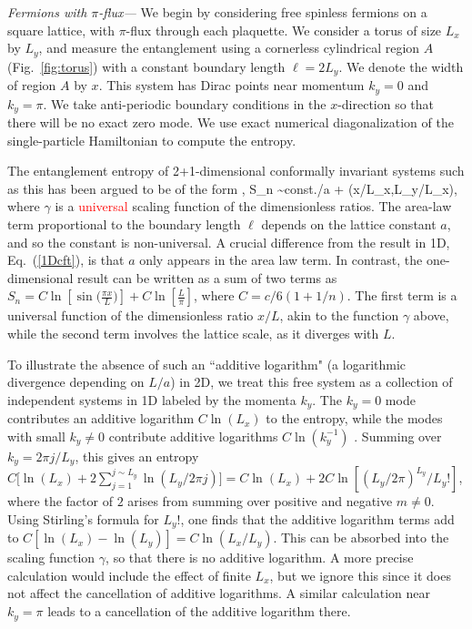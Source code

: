 \documentclass[prb,aps,twocolumn,floatfix,amsmath,amssymb,superscriptaddress,tightenlines]{revtex4}
\begin{document}
{\it Fermions with $\pi$-flux---}
We begin by considering
free spinless fermions on a square lattice, with $\pi$-flux through each plaquette.  We consider a torus of size $L_x$ by $L_y$, and
measure the entanglement  
using a cornerless cylindrical region $A$ (Fig.~\ref{fig:torus}) with a constant boundary length $\ell = 2L_y$.
We denote the width of region $A$ by $x$.
This system has Dirac points near momentum $k_y=0$ and $k_y=\pi$.  We take anti-periodic boundary conditions in the $x$-direction so that there will be no exact zero mode.  We use exact numerical diagonalization of the single-particle Hamiltonian to compute the entropy.

The entanglement entropy of 2+1-dimensional conformally invariant systems such as this has been argued to be of the form \cite{ryu,ZGV},
\be
S_n \sim {\rm const.}\times \ell /a + \gamma(x/L_x,L_y/L_x),
\ee
where $\gamma$ is a \textcolor{red}{universal} scaling function of the dimensionless ratios.
The area-law term proportional to the boundary length $\ell$ depends on the lattice constant $a$, and so the constant is non-universal. A crucial difference
from the result in 1D, Eq.~(\ref{1Dcft}), is that $a$ only appears in the area law term.  In contrast, the one-dimensional result can be written as a sum of two terms as
$S_n =C \ln[\sin\big( \frac{\pi x}{L} \big)]+ C\ln[\frac{L}{\pi}] $, where $C=c/6(1+1/n)$.
The first term is a universal function of the dimensionless ratio $x/L$, akin to the function $\gamma$ above, while the second term involves the lattice scale, as it diverges with $L$.

To illustrate the absence of such an ``additive logarithm" (a logarithmic divergence depending on $L/a$) in 2D,
we treat this free system as a collection of independent systems in 1D labeled by the momenta $k_y$.
The $k_y=0$ mode contributes an additive logarithm $C \ln(L_x)$ to the entropy, while the modes with small $k_y \neq 0$ contribute additive logarithms $C \ln(k_y^{-1})$ \cite{Holzhey,Korepin,Cardy}. Summing over $k_y=2\pi j/L_y$, this gives an entropy $C \big[ \ln(L_x)+2\sum_{j=1}^{j \sim L_y} \ln(L_y/2 \pi j) \big]=C\ln(L_x) + 2 C\ln[(L_y/2\pi)^{L_y}/L_y!]$, where the factor of $2$ arises from summing over positive and negative $m\neq 0$.  Using Stirling's formula for $L_y!$, one finds that the additive logarithm terms add to $C[\ln(L_x)-\ln(L_y)]=C\ln(L_x/L_y)$. This can be absorbed into the scaling function $\gamma$, so that there is no additive logarithm.  A more precise calculation would include the effect of finite $L_x$, but we ignore this since it does not affect the cancellation of additive logarithms. A similar calculation near $k_y=\pi$ leads to a cancellation of the additive logarithm there.
\end{document}
